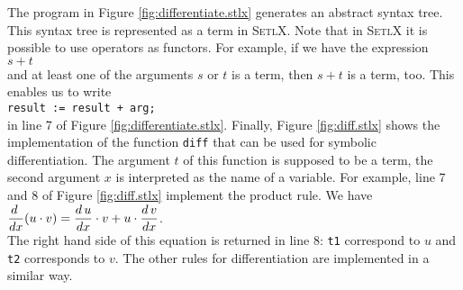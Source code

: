 The program in Figure \ref{fig:differentiate.stlx} generates an abstract syntax tree.
This syntax tree is represented as a term in \textsc{SetlX}.  Note that in \textsc{SetlX}
it is possible to use operators as functors.  For example, if we have the expression
\\[0.2cm]
\hspace*{1.3cm}
$s + t$
\\[0.2cm]
and at least one of the arguments $s$ or $t$ is a term, then $s + t$ is a term, too.
This enables us to write
\\[0.2cm]
\hspace*{1.3cm}
\texttt{result := result + arg;}
\\[0.2cm]
in line 7 of Figure \ref{fig:differentiate.stlx}.  Finally, Figure \ref{fig:diff.stlx}
shows the implementation of the function \texttt{diff} that can be used for symbolic
differentiation.  The argument $t$ of this function is supposed to be a term, the second
argument $x$ is interpreted as the name of a variable.  For example, line 7 and 8 of Figure
\ref{fig:diff.stlx} implement the product rule.  We have
\\[0.2cm]
\hspace*{1.3cm}
$\displaystyle\frac{d\;}{dx}(u \cdot v) = \frac{d\,u}{dx} \cdot v + u \cdot \frac{d\,v}{dx}$. 
\\[0.2cm]
The right hand side of this equation is returned in line 8: \texttt{t1} correspond to $u$
and \texttt{t2} corresponds to $v$.  The other rules for differentiation are implemented
in a similar way.

